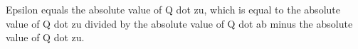 Epsilon equals the absolute value of Q dot zu, which is equal to the absolute value of Q dot zu divided by the absolute value of Q dot ab minus the absolute value of Q dot zu.